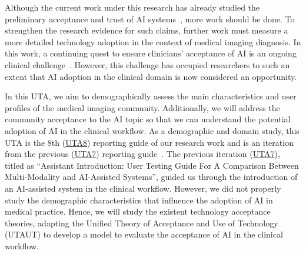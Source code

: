 Although the current work under this research has already studied the preliminary acceptance and trust of AI systems~\cite{CALISTO2021102607}, more work should be done.
To strengthen the research evidence for such claims, further work must measure a more detailed technology adoption in the context of medical imaging diagnosis.
In this work, a continuing quest to ensure clinicians' acceptance of AI is an ongoing clinical challenge~\cite{10.13140/RG.2.2.21110.34888, UTA10, UTA11, UTA8, UTA9}.
However, this challenge has occupied researchers to such an extent that AI adoption in the clinical domain is now considered an opportunity.

In this UTA, we aim to demographically assess the main characteristics and user profiles of the medical imaging community.
Additionally, we will address the community acceptance to the AI topic so that we can understand the potential adoption of AI in the clinical workflow.
As a demographic and domain study, this UTA is the 8th (\href{https://github.com/MIMBCD-UI/meta/wiki/User-Research#test-8-demographic--domain-study-}{UTA8}) reporting guide of our research work and is an iteration~\cite{10.13140/RG.2.2.14555.52009/2} from the previous (\href{https://github.com/MIMBCD-UI/meta/wiki/User-Research#test-7-multi-modality-vs-assistant-}{UTA7}) reporting guide~\cite{https://doi.org/10.13140/rg.2.2.16566.14403/1}.
The previous iteration (\href{https://github.com/MIMBCD-UI/meta/wiki/User-Research#test-7-multi-modality-vs-assistant-}{UTA7}), titled as ``Assistant Introduction: User Testing Guide For A Comparison Between Multi-Modality and AI-Assisted Systems'', guided us through the introduction of an AI-assisted system in the clinical workflow.
However, we did not properly study the demographic characteristics that influence the adoption of AI in medical practice.
Hence, we will study the existent technology acceptance theories, adapting the Unified Theory of Acceptance and Use of Technology (UTAUT) to develop a model to evaluate the acceptance of AI in the clinical workflow.